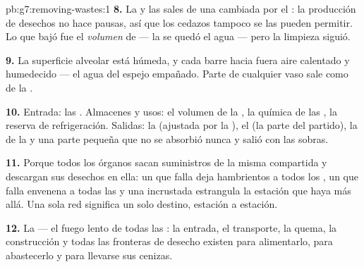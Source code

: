 \begin{solution}{pb:g7:removing-wastes:1}
\textbf{8.} La  y las sales de una  cambiada por el : la
producción de desechos no hace pausas, así que los cedazos tampoco se
las pueden permitir. Lo que bajó fue el \emph{volumen} de  --- la
 se quedó el agua --- pero la limpieza siguió.

\textbf{9.} La superficie alveolar está húmeda, y cada 
barre hacia fuera aire calentado y humedecido --- el agua del espejo
empañado. Parte de cualquier vaso sale como  de la .

\textbf{10.} Entrada: las . Almacenes y usos: el volumen de
la , la química de las , la reserva de refrigeración.
Salidas: la  (ajustada por la ), el  (la parte
del partido), la  de la  y una parte pequeña que no
se absorbió nunca y salió con las sobras.

\textbf{11.} Porque todos los órganos sacan suministros de la misma
 compartida y descargan sus desechos en ella: un  que falla
deja hambrientos a todos los , un  que falla envenena a
todas las  y una  incrustada estrangula la estación que
haya más allá. Una sola red significa un solo destino, estación a
estación.

\textbf{12.} La  --- el fuego lento de todas las : la
entrada, el transporte, la quema, la construcción y todas las fronteras
de desecho existen para alimentarlo, para abastecerlo y para llevarse
sus cenizas.
\end{solution}
